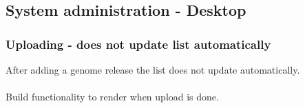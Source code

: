 \subsection{System administration - Desktop}
\subsubsection{Uploading - does not update list automatically}
After adding a genome release the list does not update automatically. \\
\\
Build functionality to render when upload is done. 
